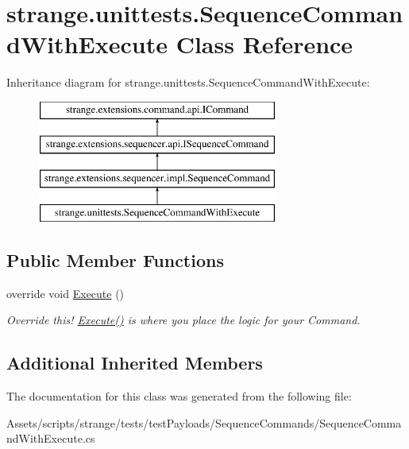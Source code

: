 \hypertarget{classstrange_1_1unittests_1_1_sequence_command_with_execute}{\section{strange.\-unittests.\-Sequence\-Command\-With\-Execute Class Reference}
\label{classstrange_1_1unittests_1_1_sequence_command_with_execute}
}
Inheritance diagram for strange.\-unittests.\-Sequence\-Command\-With\-Execute\-:\begin{figure}[H]
\begin{center}
\leavevmode
\includegraphics[height=4.000000cm]{classstrange_1_1unittests_1_1_sequence_command_with_execute}
\end{center}
\end{figure}
\subsection*{Public Member Functions}
\begin{DoxyCompactItemize}
\item 
\hypertarget{classstrange_1_1unittests_1_1_sequence_command_with_execute_a5cd4074c3ca876abf4b16291022d9102}{override void \hyperlink{classstrange_1_1unittests_1_1_sequence_command_with_execute_a5cd4074c3ca876abf4b16291022d9102}{Execute} ()}\label{classstrange_1_1unittests_1_1_sequence_command_with_execute_a5cd4074c3ca876abf4b16291022d9102}

\begin{DoxyCompactList}\small\item\em Override this! {\ttfamily \hyperlink{classstrange_1_1unittests_1_1_sequence_command_with_execute_a5cd4074c3ca876abf4b16291022d9102}{Execute()}} is where you place the logic for your Command. \end{DoxyCompactList}\end{DoxyCompactItemize}
\subsection*{Additional Inherited Members}


The documentation for this class was generated from the following file\-:\begin{DoxyCompactItemize}
\item 
Assets/scripts/strange/tests/test\-Payloads/\-Sequence\-Commands/Sequence\-Command\-With\-Execute.\-cs\end{DoxyCompactItemize}
